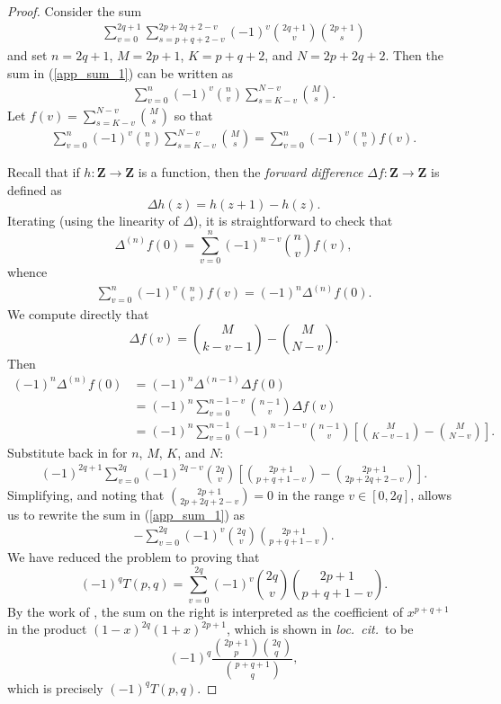 \documentclass{amsart}
\newcommand{\Z}{\mathbf{Z}}
\theoremstyle{plain}
\theoremstyle{remark}
\begin{document}
\begin{proof}
Consider the sum 
\begin{align} \label{app_sum_1}
 \sum_{v=0}^{2q+1} \sum_{s=p+q+2-v}^{2p+2q+2-v} (-1)^v \binom{2q+1}{v}\binom{2p+1}{s}
\end{align}
and set $n=2q+1$, $M = 2p+1$, $K=p+q+2$, and $N= 2p+2q+2$.  Then the sum in (\ref{app_sum_1}) can be written as
\begin{align} \label{app_sum_2}
\sum_{v=0}^n (-1)^v \binom{n}{v} \sum_{s=K-v}^{N-v} \binom{M}{s}.
\end{align}
Let $f(v) = \sum_{s=K-v}^{N-v} \binom{M}{s}$ so that 
\begin{align} \label{app_sum_3}
\sum_{v=0}^n (-1)^v \binom{n}{v} \sum_{s=K-v}^{N-v} \binom{M}{s} = \sum_{v=0}^n (-1)^v \binom{n}{v} f(v).
\end{align}

Recall that if $h: \Z \to \Z$ is a function, then the \emph{forward difference} $\Delta f:\Z \to \Z$ is defined as
\[
\Delta h(z) = h(z+1) - h(z).
\]
Iterating (using the linearity of  $\Delta$), it is straightforward to check that
\[
\Delta^{(n)} f(0) = \sum_{v=0}^n (-1)^{n-v} \binom{n}{v}f(v),
\]
whence
\begin{align} \label{app_sum_4}
\sum_{v=0}^n (-1)^v \binom{n}{v} f(v) = (-1)^n \Delta^{(n)} f(0).
\end{align}
We compute directly that
\[
\Delta f(v) = \binom{M}{k-v-1} - \binom{M}{N-v}.  
\]
Then 
\begin{align}
(-1)^n \Delta^{(n)} f(0) &= (-1)^n \Delta^{(n-1)} \Delta f(0)  \nonumber \\
&=  (-1)^n \sum_{v=0}^{n-1-v} \binom{n-1}{v} \Delta f(v) \nonumber \\
&= (-1)^n \sum_{v=0}^{n-1} (-1)^{n-1-v} \binom{n-1}{v} \left[  \binom{M}{K-v-1} - \binom{M}{N-v}\right]. \nonumber 
\end{align}
Substitute back in for $n$, $M$, $K$, and $N$:
\begin{align} 
(-1)^{2q+1} \sum_{v=0}^{2q} (-1)^{2q-v}\binom{2q}{v} \left[ \binom{2p+1}{p+q+1-v} - \binom{2p+1}{2p + 2q + 2 - v} \right]. \nonumber
\end{align}
Simplifying, and noting that $\binom{2p+1}{2p + 2q + 2 - v}  = 0$ in the range $v \in [0,2q]$, allows us to rewrite the sum in (\ref{app_sum_1}) as 
\begin{align} \label{app_sum_5}
- \sum_{v=0}^{2q} (-1)^v \binom{2q}{v} \binom{2p+1}{p+q+1-v}.
\end{align}
We have reduced the problem to proving that
\[
(-1)^qT(p,q) = \sum_{v=0}^{2q} (-1)^v \binom{2q}{v} \binom{2p+1}{p+q+1-v}.
\]
By the work of  \cite[\S 3]{gs}, the sum on the right is interpreted as the coefficient of $x^{p+q+1}$ in the product $(1-x)^{2q}(1+x)^{2p+1}$, which is shown in \emph{loc.~cit.}~to be 
\[
(-1)^q\frac{\binom{2p+1}{p}\binom{2q}{q}}{\binom{p+q+1}{q}}, 
\]
which is precisely $(-1)^q T(p,q)$.
\end{proof}
\end{document}
